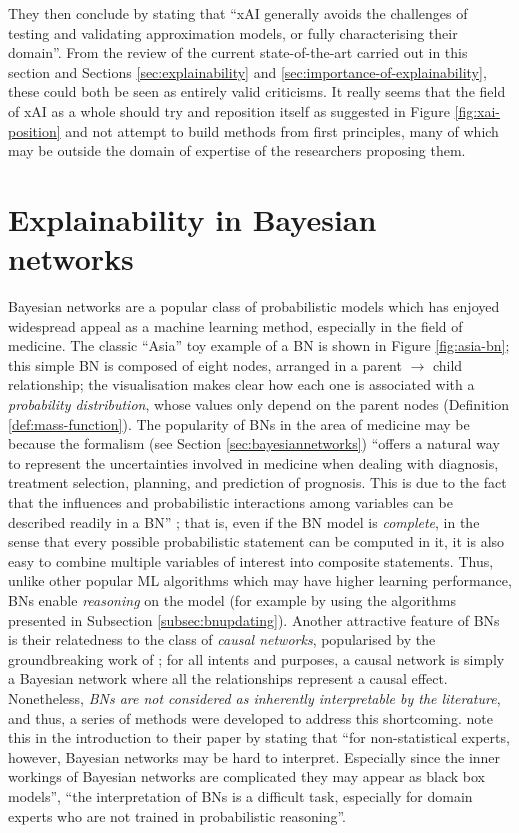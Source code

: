 They then conclude by stating that \enquote{xAI generally avoids the challenges of testing and validating approximation models, or fully characterising their domain}.
From the review of the current state-of-the-art carried out in this section and Sections \ref{sec:explainability} and \ref{sec:importance-of-explainability}, these could both be seen as entirely valid criticisms.
It really seems that the field of xAI as a whole should try and reposition itself as suggested in Figure \ref{fig:xai-position} and not attempt to build methods from first principles, many of which may be outside the domain of expertise of the researchers proposing them.

\section{Explainability in Bayesian networks} \label{sec:explainability-in-bayesian-networks}
Bayesian networks are a popular class of probabilistic models which has enjoyed widespread appeal as a machine learning method, especially in the field of medicine.
The classic \enquote{Asia} toy example of a BN is shown in Figure \ref{fig:asia-bn}; this simple BN is composed of eight nodes, arranged in a parent $\rightarrow$ child relationship; the visualisation makes clear how each one is associated with a \textit{probability distribution}, whose values only depend on the parent nodes (Definition \ref{def:mass-function}).
The popularity of BNs in the area of medicine may be because the formalism (see Section \ref{sec:bayesiannetworks}) \enquote{offers a natural way to represent the uncertainties involved in medicine when dealing with diagnosis, treatment selection, planning, and prediction of prognosis. 
This is due to the fact that the influences and probabilistic interactions among variables can be described readily in a BN} \citep{Lucas2001}; that is, even if the BN model is \textit{complete}, in the sense that every possible probabilistic statement can be computed in it, it is also easy to combine multiple variables of interest into composite statements.
Thus, unlike other popular ML algorithms which may have higher learning performance, BNs enable \textit{reasoning} on the model (for example by using the algorithms presented in Subsection \ref{subsec:bnupdating}).
Another attractive feature of BNs is their relatedness to the class of \textit{causal networks}, popularised by the groundbreaking work of \citet{Pearl1988}; for all intents and purposes, a causal network is simply a Bayesian network where all the relationships represent a causal effect.
Nonetheless, \textit{BNs are not considered as inherently interpretable by the literature}, and thus, a series of methods were developed to address this shortcoming.
\citet{timmer2015explaining} note this in the introduction to their paper by stating that \enquote{for non-statistical experts, however, Bayesian networks may be hard to interpret. Especially since the inner workings of Bayesian networks are complicated they may appear as black box models}, \enquote{the interpretation of BNs is a difficult task, especially for domain experts who are not trained in probabilistic reasoning}.

